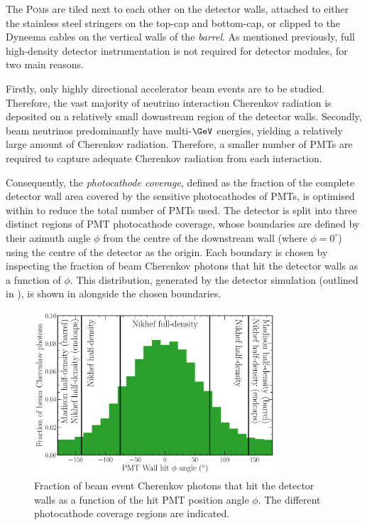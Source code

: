 The \textsc{Pom}s are tiled next to each other on the detector walls, attached to either the
stainless steel stringers on the top-cap and bottom-cap, or clipped to the Dyneema cables on the
vertical walls of the \emph{barrel}. As mentioned previously, full high-density detector
instrumentation is not required for \chips detector modules, for two main reasons.

Firstly, only highly directional accelerator beam events are to be studied. Therefore, the vast
majority of neutrino interaction Cherenkov radiation is deposited on a relatively small downstream
region of the detector walls. Secondly, beam neutrinos predominantly have multi-$\GeV$ energies,
yielding a relatively large amount of Cherenkov radiation. Therefore, a smaller number of PMTs are
required to capture adequate Cherenkov radiation from each interaction.

Consequently, the \emph{photocathode coverage}, defined as the fraction of the complete detector
wall area covered by the sensitive photocathodes of PMTs, is optimised within \chipsfive to reduce
the total number of PMTs used. The detector is split into three distinct regions of PMT
photocathode coverage, whose boundaries are defined by their azimuth angle $\phi$ from the centre
of the downstream wall (where $\phi=0^{\circ}$) using the centre of the detector as the origin.
Each boundary is chosen by inspecting the fraction of beam Cherenkov photons that hit the detector
walls as a function of $\phi$. This distribution, generated by the detector simulation (outlined
in ), is shown in  alongside the
chosen boundaries.

\begin{figure} %
    \includegraphics[width=0.8\textwidth]{diagrams/4-chips/coverage.pdf}
    \caption[Fraction of beam event Cherenkov photons that hit the detector walls as a function of
        the hit PMT position angle] {Fraction of beam event Cherenkov photons that hit the
        detector walls as a function of the hit PMT position angle $\phi$. The different
        photocathode coverage regions are indicated.}
    \label{fig:coverage}
\end{figure}

